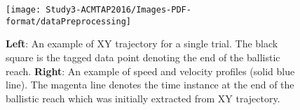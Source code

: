 \begin{figure}[ht]
	\centering
	\texttt{[image: Study3-ACMTAP2016/Images-PDF-format/dataPreprocessing]}
	\caption{\textbf{Left}: An example of XY trajectory for a single trial. The black square is the tagged data point denoting the end of the ballistic reach. \textbf{Right}: An example of speed and velocity profiles (solid blue line). The magenta line denotes the time instance at the end of the ballistic reach which was initially extracted from XY trajectory.}
	\label{fig:dataPreprocessing}
\end{figure}

